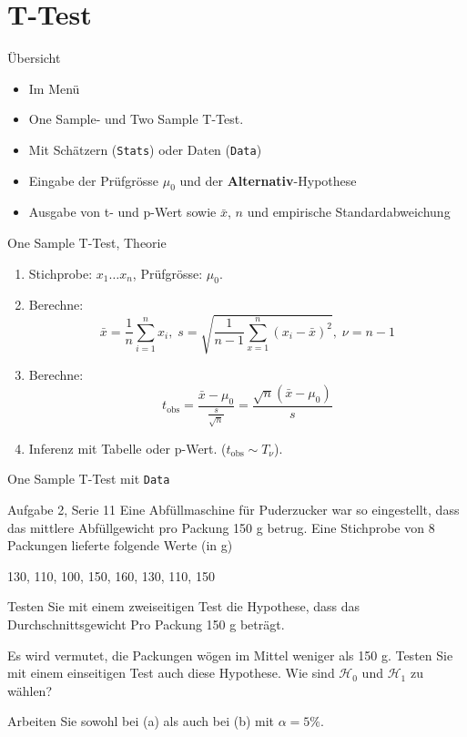 \documentclass{beamer}
\newlength{\tikey}
\newcommand{\keystroke}[1]{\settowidth{\tikey}{\scriptsize #1}\psframebox[framearc=0.2]{\parbox{\tikey}{\scriptsize #1}}}
\begin{document}
\section{T-Test}
\begin{frame}{Übersicht}
\begin{itemize}
\item Im Menü \keystroke{F6}
\item One Sample- und Two Sample T-Test.
\item Mit Schätzern (\texttt{Stats}) oder Daten (\texttt{Data})
\item Eingabe der Prüfgrösse $\mu_0$ und der \textbf{Alternativ}-Hypothese
\item Ausgabe von t- und p-Wert sowie $\bar{x}$, $n$ und empirische Standardabweichung
\end{itemize}
\end{frame}

\begin{frame}{One Sample T-Test, Theorie}
\begin{enumerate}
\item Stichprobe: $x_1\ldots x_n$, Prüfgrösse: $\mu_0$.
\item Berechne:
$$
\bar{x}=\frac{1}{n}\sum_{i=1}^n x_i,\;
s=\sqrt{\frac{1}{n-1}\sum_{x=1}^{n}(x_i-\bar{x})^2},\;
\nu=n-1
$$
\item Berechne:
$$
t_\text{obs}=\frac{\bar{x}-\mu_0}{\frac{s}{\sqrt{n}}} = 
\frac{\sqrt{n}\left(\bar{x}-\mu_0\right)}{s}
$$
\item Inferenz mit Tabelle oder p-Wert. ($t_\text{obs}\sim T_\nu$).
\end{enumerate}
\end{frame}

\begin{frame}{One Sample T-Test mit \texttt{Data}}
\begin{beamerboxesrounded}[shadow]{Aufgabe 2, Serie 11}
Eine Abfüllmaschine für Puderzucker war so eingestellt, dass das mittlere Abfüllgewicht
pro Packung 150 g betrug. Eine Stichprobe von 8 Packungen lieferte folgende Werte (in
g)

\begin{center}
130, 110, 100, 150, 160, 130, 110, 150
\end{center}

\begin{outline}
\item Testen Sie mit einem zweiseitigen Test die Hypothese, dass das
Durchschnittsgewicht Pro Packung 150 g beträgt.
\item Es  wird vermutet, die Packungen wögen im Mittel weniger als 150 g. Testen Sie
mit einem einseitigen Test auch diese Hypothese. Wie sind $\mathcal{H}_0$ und 
$\mathcal{H}_1$ zu wählen?
\end{outline}
Arbeiten Sie sowohl bei (a) als auch bei (b) mit $\alpha = 5\%$.
\end{beamerboxesrounded}
\end{frame}
\end{document}
